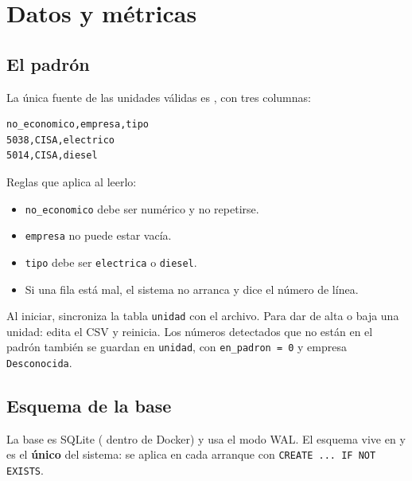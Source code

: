 \chapter{Datos y métricas}
\label{cap:datos}

\section{El padrón}

La única fuente de las unidades válidas es , con tres
columnas:

\begin{lstlisting}[caption={Formato de \texttt{padron.csv}}, label={lst:padron}]
no_economico,empresa,tipo
5038,CISA,electrico
5014,CISA,diesel
\end{lstlisting}

Reglas que aplica  al leerlo:

\begin{itemize}
  \item \texttt{no\_economico} debe ser numérico y no repetirse.
  \item \texttt{empresa} no puede estar vacía.
  \item \texttt{tipo} debe ser \texttt{electrica} o \texttt{diesel}.
  \item Si una fila está mal, el sistema no arranca y dice el número de línea.
\end{itemize}

Al iniciar,  sincroniza la tabla \texttt{unidad} con
el archivo. Para dar de alta o baja una unidad: edita el CSV y reinicia. Los
números detectados que no están en el padrón también se guardan en
\texttt{unidad}, con \texttt{en\_padron = 0} y empresa
\texttt{Desconocida}.

\section{Esquema de la base}

La base es SQLite ( dentro de Docker) y usa el modo
WAL. El esquema vive en  y es el \textbf{único} del
sistema: se aplica en cada arranque con \texttt{CREATE ... IF NOT EXISTS}.

